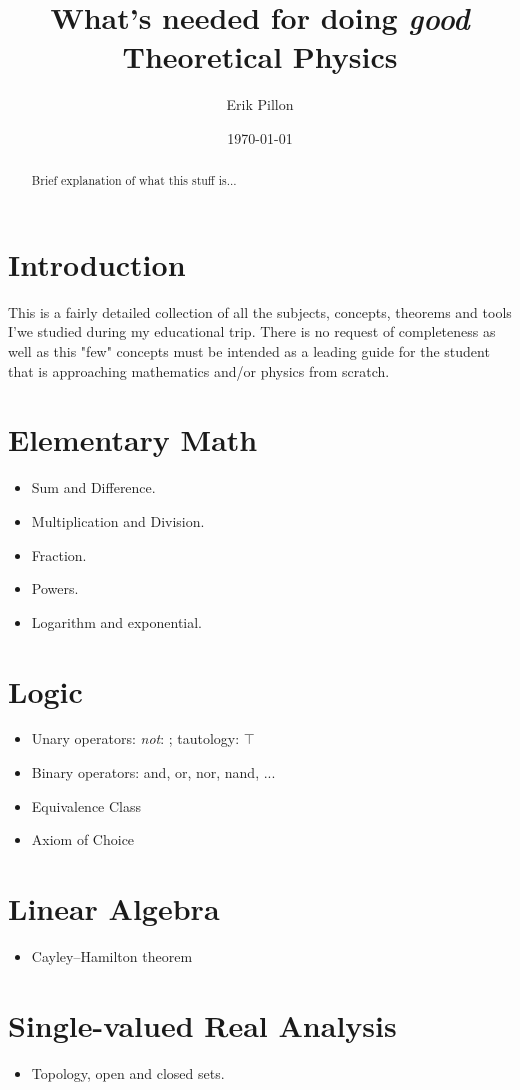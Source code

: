 \documentclass[10pt]{article}
\author{Erik Pillon}
\date{\today}
\title{What's needed for doing \emph{good} Theoretical Physics}
\begin{document}
\maketitle
\begin{abstract}
Brief explanation of what this stuff is... 
\end{abstract}
\section*{Introduction}
This is a fairly detailed collection of all the subjects, concepts, theorems and tools I'we studied during my educational trip. There is no request of completeness as well as this "few" concepts must be intended as a leading guide for the student that is approaching mathematics and/or physics from scratch.
\section{Elementary Math}
\begin{itemize}
	\item Sum and Difference.
	\item Multiplication and Division.
	\item Fraction.
	\item Powers.
	\item Logarithm and exponential.
\end{itemize}

\section{Logic}
\begin{itemize}
	\item Unary operators: \emph{not}: \textlnot  ; tautology: $ \top $	 
	\item Binary operators: and, or, nor, nand, ...
	\item Equivalence Class
	\item Axiom of Choice
\end{itemize}

\section{Linear Algebra}
\begin{itemize}
	\item Cayley–Hamilton theorem
\end{itemize}

\section{Single-valued Real Analysis}
\begin{itemize}
	\item Topology, open and closed sets.
\end{itemize}
\end{document}
